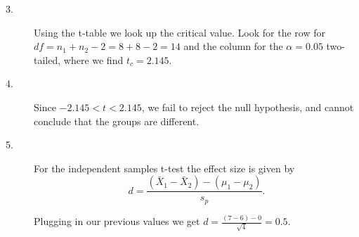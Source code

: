 \documentclass{tufte-handout}
\begin{document}
\begin{fullwidth}
\begin{description}
\item[3.] Using the t-table we look up the critical value. Look for the row for $df=n_1+n_2-2=8+8-2=14$ and the column for the $\alpha=0.05$ two-tailed, where we find $t_c=2.145$.

\item[4.] Since $-2.145<t<2.145$, we fail to reject the null hypothesis, and cannot conclude that the groups are different.

\item[5.]For the independent samples t-test the effect size is given by
\begin{equation*}
d=\frac{(\bar{X}_1-\bar{X}_2)-(\mu_1-\mu_2)}{s_p}.
\end{equation*}

Plugging in our previous values we get $d=\frac{(7-6)-0}{\sqrt{4}}=0.5$.
\end{description}
\end{fullwidth}
\end{document}
